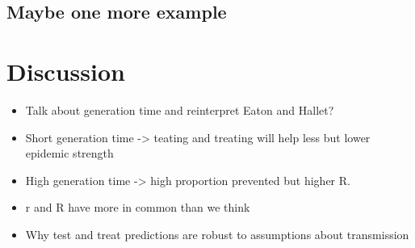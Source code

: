 \documentclass{article}\usepackage[]{graphicx}\usepackage[]{color}
\begin{document}
\subsection{Maybe one more example}

\section{Discussion}


\begin{itemize}
	\item Talk about generation time and reinterpret Eaton and Hallet?
	\item Short generation time -> teating and treating will help less but lower epidemic strength
	\item High generation time -> high proportion prevented but higher R.
\end{itemize}

\begin{itemize}
	\item r and R have more in common than we think
	\item Why test and treat predictions are robust to assumptions about transmission
\end{itemize}
\end{document}
